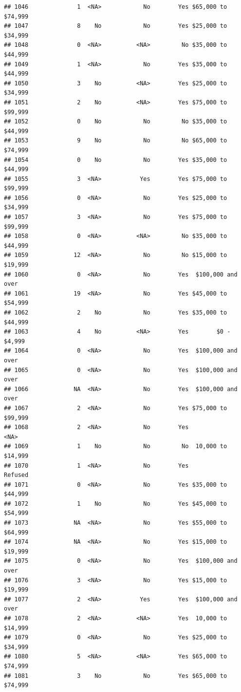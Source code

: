 \documentclass[man]{apa6}
\begin{document}
\begin{verbatim}
## 1046              1  <NA>            No        Yes $65,000 to $74,999
## 1047              8    No            No        Yes $25,000 to $34,999
## 1048              0  <NA>          <NA>         No $35,000 to $44,999
## 1049              1  <NA>            No        Yes $35,000 to $44,999
## 1050              3    No          <NA>        Yes $25,000 to $34,999
## 1051              2    No          <NA>        Yes $75,000 to $99,999
## 1052              0    No            No         No $35,000 to $44,999
## 1053              9    No            No         No $65,000 to $74,999
## 1054              0    No            No        Yes $35,000 to $44,999
## 1055              3  <NA>           Yes        Yes $75,000 to $99,999
## 1056              0  <NA>            No        Yes $25,000 to $34,999
## 1057              3  <NA>            No        Yes $75,000 to $99,999
## 1058              0  <NA>          <NA>         No $35,000 to $44,999
## 1059             12  <NA>            No         No $15,000 to $19,999
## 1060              0  <NA>            No        Yes  $100,000 and over
## 1061             19  <NA>            No        Yes $45,000 to $54,999
## 1062              2    No            No        Yes $35,000 to $44,999
## 1063              4    No          <NA>        Yes        $0 - $4,999
## 1064              0  <NA>            No        Yes  $100,000 and over
## 1065              0  <NA>            No        Yes  $100,000 and over
## 1066             NA  <NA>            No        Yes  $100,000 and over
## 1067              2  <NA>            No        Yes $75,000 to $99,999
## 1068              2  <NA>            No        Yes               <NA>
## 1069              1    No            No         No  10,000 to $14,999
## 1070              1  <NA>            No        Yes            Refused
## 1071              0  <NA>            No        Yes $35,000 to $44,999
## 1072              1    No            No        Yes $45,000 to $54,999
## 1073             NA  <NA>            No        Yes $55,000 to $64,999
## 1074             NA  <NA>            No        Yes $15,000 to $19,999
## 1075              0  <NA>            No        Yes  $100,000 and over
## 1076              3  <NA>            No        Yes $15,000 to $19,999
## 1077              2  <NA>           Yes        Yes  $100,000 and over
## 1078              2  <NA>          <NA>        Yes  10,000 to $14,999
## 1079              0  <NA>            No        Yes $25,000 to $34,999
## 1080              5  <NA>          <NA>        Yes $65,000 to $74,999
## 1081              3    No            No        Yes $65,000 to $74,999

\end{verbatim}
\end{document}
